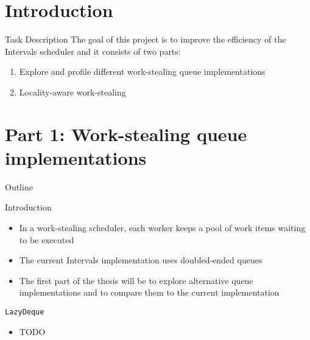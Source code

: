 \section*{Introduction}


\begin{frame}{Task Description}
  The goal of this project is to improve the efficiency of the
  Intervals scheduler and it consists of two parts:


  \begin{enumerate}
  \item Explore and profile different work-stealing queue
    implementations
  \item Locality-aware work-stealing
  \end{enumerate}
\end{frame}


\section{Part 1: Work-stealing queue implementations}

\begin{frame}{Outline}
  \tableofcontents[current]
\end{frame}

\begin{frame}{Introduction}
  \begin{itemize}
  \item In a work-stealing scheduler, each worker keeps a pool of work
    items waiting to be executed
  \item The current Intervals implementation uses doubled-ended queues
  \item The first part of the thesis will be to explore alternative
    queue implementations and to compare them to the current
    implementation
  \end{itemize}
\end{frame}

\begin{frame}{\lstinline!LazyDeque!}
  \begin{itemize}
  \item TODO
  \end{itemize}
\end{frame}

